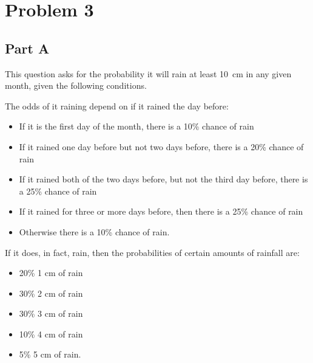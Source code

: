 \documentclass[12pt]{article}
\begin{document}
\section{Problem 3}

\subsection{Part A}

	This question asks for the probability it will rain at least 10~cm in any given month, 
	given the following conditions.
	
	The odds of it raining depend on if it rained the day before:
	\begin{itemize}
		\item If it is the first day of the month, there is a 10\% chance of rain
		\item If it rained one day before but not two days before, there is a 20\% 
		chance of rain
		\item If it rained both of the two days before, but not the third day before, there is a 
		25\% chance of rain 
		\item If it rained for three or more days before, then there is a 25\% chance of rain
		\item Otherwise there is a 10\% chance of rain. 
	\end{itemize}
	If it does, in fact, rain, then the probabilities of certain amounts of rainfall are:
	\begin{itemize}
		\item 20\% 1 cm of rain
		\item 30\% 2 cm of rain
		\item 30\% 3 cm of rain
		\item 10\% 4 cm of rain
		\item 5\% 5 cm of rain.
	\end{itemize}
	
\end{document}
